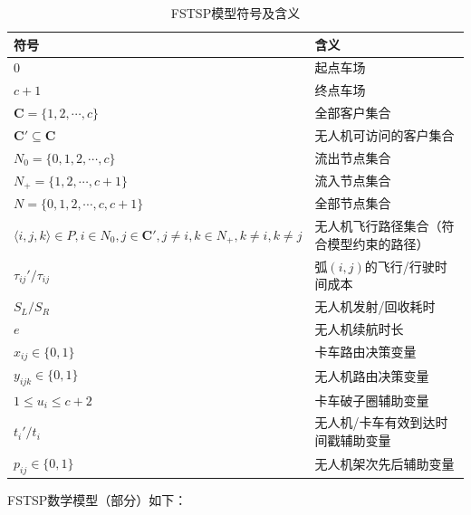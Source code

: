 \begin{table}[!htbp]
    \centering
    \caption{FSTSP模型符号及含义}
    \label{tab:fstsp-sign-meaning}
    \begin{tabularx}{\textwidth}{lX}
        \toprule[1pt] %
        符号 & 含义 \\
        \midrule[0.75pt] %
        $0$ & 起点车场 \\
        $c + 1$ & 终点车场 \\
        $\mathbf{C}=\{1,2,\cdots,c\}$ & 全部客户集合 \\
        $\mathbf{C}' \subseteq \mathbf{C}$ & 无人机可访问的客户集合 \\
        $N_0 = \{0,1,2,\cdots,c\}$ & 流出节点集合 \\
        $N_+ = \{1,2,\cdots,c + 1\}$ & 流入节点集合 \\
        $N = \{0,1,2,\cdots,c,c + 1\}$ & 全部节点集合 \\
        $\langle i,j,k\rangle \in P, i \in N_0, j \in \mathbf{C}', j \neq i, k \in N_+, k \neq i, k \neq j$ & 无人机飞行路径集合（符合模型约束的路径） \\
        $\tau_{ij}'/\tau_{ij}$ & 弧$(i,j)$的飞行/行驶时间成本 \\
        $S_L/S_R$ & 无人机发射/回收耗时 \\
        $e$ & 无人机续航时长 \\
        $x_{ij} \in \{0,1\}$ & 卡车路由决策变量 \\
        $y_{ijk} \in \{0,1\}$ & 无人机路由决策变量 \\
        $1 \leq u_i \leq c + 2$ & 卡车破子圈辅助变量 \\
        $t_i'/t_i$ & 无人机/卡车有效到达时间戳辅助变量 \\
        $p_{ij} \in \{0,1\}$ & 无人机架次先后辅助变量 \\
        \bottomrule[1pt] %
    \end{tabularx}
\end{table}

FSTSP数学模型（部分）如下：


